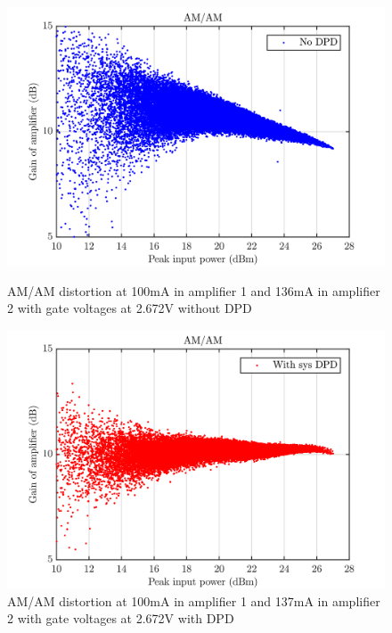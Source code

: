 \begin{figure}[H]
  \centering
  \begin{minipage}[b]{0.5\textwidth}
	\includegraphics[scale = 0.5]{figures/measurement/cree/meas5/amam_no_dpd_2p672v.png}
	\caption{AM/AM distortion at 100mA in amplifier 1 and 136mA in amplifier 2 with gate voltages at 2.672V without DPD}	
    \label{fig:meas5_7}
  \end{minipage}
  \hfill
  \begin{minipage}[b]{0.4\textwidth}
	\includegraphics[scale = 0.5]{figures/measurement/cree/meas5/amam_sys_dpd_2p672v.png}
	\caption{AM/AM distortion at 100mA in amplifier 1 and 137mA in amplifier 2 with gate voltages at 2.672V with DPD}
    \label{fig:meas5_8}
  \end{minipage}
\end{figure}



